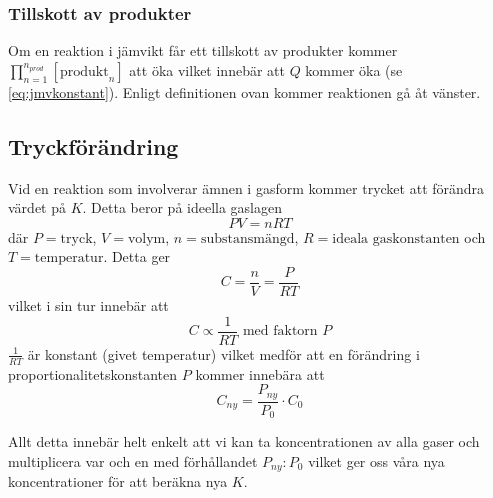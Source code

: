 \subsubsection[Produkter]{Tillskott av produkter}
Om en reaktion i jämvikt får ett tillskott av produkter kommer $\prod^{n_{prod}}_{n=1}[\mathrm{produkt}_n]$ att öka vilket innebär att $Q$ kommer öka (se \cref{eq:jmvkonstant}). Enligt definitionen ovan kommer reaktionen gå åt vänster.

\subsection{Tryckförändring}

Vid en reaktion som involverar ämnen i gasform kommer trycket att förändra värdet på $K$. Detta beror på ideella gaslagen
\begin{equation*}
    PV = nRT
\end{equation*}
där $P = \text{tryck}$, $V = \text{volym}$, $n = \text{substansmängd}$, $R = \text{ideala gaskonstanten}$ och $T = \text{temperatur}$. Detta ger
\begin{equation*}
    C = \frac{n}{V} = \frac{P}{RT}
\end{equation*}
vilket i sin tur innebär att
\begin{equation*}
    C \propto \frac{1}{RT} \text{ med faktorn } P
\end{equation*}
$\frac{1}{RT}$ är konstant (givet temperatur) vilket medför att en förändring i proportionalitetskonstanten $P$ kommer innebära att
\begin{equation*}
    C_{ny} = \frac{P_{ny}}{P_0} \cdot C_0
\end{equation*}

Allt detta innebär helt enkelt att vi kan ta koncentrationen av alla gaser och multiplicera var och en med förhållandet $P_{ny}:P_0$ vilket ger oss våra nya koncentrationer för att beräkna nya $K$.

